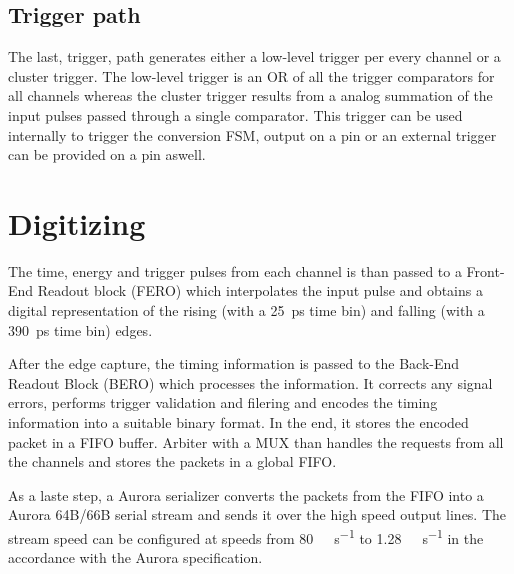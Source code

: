 \subsection{Trigger path}
The last, trigger, path generates either a low-level trigger per every channel or a cluster trigger. The low-level trigger is an OR of all the trigger comparators for all channels whereas the cluster trigger results from a analog summation of the input pulses passed through a single comparator. This trigger can be used internally to trigger the conversion FSM, output on a pin or an external trigger can be provided on a pin aswell.



\section{Digitizing}
The time, energy and trigger pulses from each channel is than passed to a Front-End Readout block (FERO) which interpolates the input pulse and obtains a digital representation of the rising (with a \SI{25}{\pico\second} time bin) and falling (with a \SI{390}{\pico\second} time bin) edges.

After the edge capture, the timing information is passed to the Back-End Readout Block (BERO) which processes the information. It corrects any signal errors, performs trigger validation and filering and encodes the timing information into a suitable binary format. In the end, it stores the encoded packet in a FIFO buffer. Arbiter with a MUX than handles the requests from all the channels and stores the packets in a global FIFO. 

As a laste step, a Aurora serializer converts the packets from the FIFO into a Aurora 64B/66B serial stream and sends it over the high speed output lines. The stream speed can be configured at speeds from \SI{80}{\mega\bit\per\second} to \SI{1.28}{\giga\bit\per\second} in the accordance with the Aurora specification.



